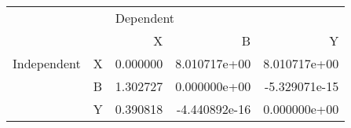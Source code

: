 \begin{tabular}{llrrr}
\toprule
            &   & \multicolumn{3}{l}{Dependent} \\
            &   &         X &             B &             Y \\
\midrule
Independent & X &  0.000000 &  8.010717e+00 &  8.010717e+00 \\
            & B &  1.302727 &  0.000000e+00 & -5.329071e-15 \\
            & Y &  0.390818 & -4.440892e-16 &  0.000000e+00 \\
\bottomrule
\end{tabular}
